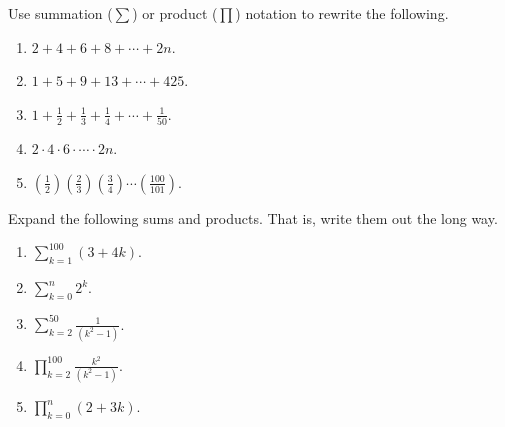 \documentclass[11pt,]{book}
\theoremstyle{ptxplainnotitle}
\theoremstyle{ptxplaintitle}
\theoremstyle{ptxdefinitionnotitle}
\theoremstyle{ptxdefinitiontitle}
\theoremstyle{ptxdefinitionnotitle}
\theoremstyle{ptxdefinitiontitle}
\theoremstyle{ptxdefinitionnotitle}
\theoremstyle{ptxdefinitiontitle}
\theoremstyle{ptxdefinitiontitlenonumber}
\theoremstyle{ptxdefinitiontitlenonumber}
\numberwithin{equation}{chapter}
\renewcommand{\d}{\displaystyle}
\begin{document}
\begin{divisionexercise}{14}\hypertarget{exercise-26}{}
\hypertarget{p-327}{}%
Use summation (\(\sum\)) or product (\(\prod\)) notation to rewrite the following. \leavevmode%
\begin{enumerate}[label=(\alph*)]
\item\hypertarget{li-172}{}\(2 + 4 + 6 + 8 + \cdots + 2n\).%
\item\hypertarget{li-173}{}\(1 + 5 + 9 + 13 + \cdots + 425\).%
\item\hypertarget{li-174}{}\(1 + \frac{1}{2} + \frac{1}{3} + \frac{1}{4} + \cdots + \frac{1}{50}\).%
\item\hypertarget{li-175}{}\(2 \cdot 4 \cdot 6 \cdot \cdots \cdot 2n\).%
\item\hypertarget{li-176}{}\((\frac{1}{2})(\frac{2}{3})(\frac{3}{4})\cdots(\frac{100}{101})\).%
\end{enumerate}
%
\end{divisionexercise}%
\begin{divisionexercise}{15}\hypertarget{exercise-27}{}
\hypertarget{p-329}{}%
Expand the following sums and products. That is, write them out the long way. \leavevmode%
\begin{enumerate}[label=(\alph*)]
\item\hypertarget{li-182}{}\(\d\sum_{k=1}^{100} (3+4k)\).%
\item\hypertarget{li-183}{}\(\d\sum_{k=0}^n 2^k\).%
\item\hypertarget{li-184}{}\(\d\sum_{k=2}^{50}\frac{1}{(k^2 - 1)}\).%
\item\hypertarget{li-185}{}\(\d\prod_{k=2}^{100}\frac{k^2}{(k^2-1)}\).%
\item\hypertarget{li-186}{}\(\d\prod_{k=0}^n (2+3k)\).%
\end{enumerate}
%
\end{divisionexercise}%
\end{document}

